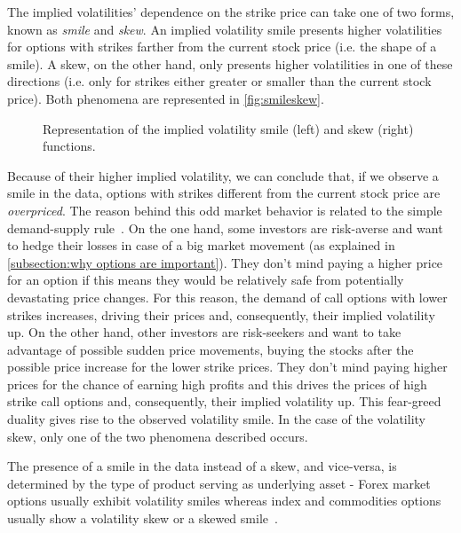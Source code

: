 The implied volatilities' dependence on the strike price can take one of two forms, known as \emph{smile} and \emph{skew}.
An implied volatility smile presents higher volatilities for options with strikes farther from the current stock price (i.e. the shape of a smile). A skew, on the other hand, only presents higher volatilities in one of these directions (i.e. only for strikes either greater or smaller than the current stock price). Both phenomena are represented in \autoref{fig:smileskew}.
\begin{figure}[!htb]
  \begin{subfigmatrix}{2}
  \end{subfigmatrix}
  \caption[Representation of the implied volatility smile and skew functions.]{Representation of the implied volatility smile (left) and skew (right) functions.}
  \label{fig:smileskew}
\end{figure}


Because of their higher implied volatility, we can conclude that, if we observe a smile in the data, options with strikes different from the current stock price are \emph{overpriced}.
The reason behind this odd market behavior is related to the simple demand-supply rule~\citep{Wilmott3}. On the one hand, some investors are risk-averse and want to hedge their losses in case of a big market movement (as explained in \autoref{subsection:why options are important}). They don't mind paying a higher price for an option if this means they would be relatively safe from potentially devastating price changes. For this reason, the demand of call options with lower strikes increases, driving their prices and, consequently, their implied volatility up. On the other hand, other investors are risk-seekers and want to take advantage of possible sudden price movements, buying the stocks after the possible price increase for the lower strike prices. They don't mind paying higher prices for the chance of earning high profits and this drives the prices of high strike call options and, consequently, their implied volatility up. This fear-greed duality gives rise to the observed volatility smile. 
In the case of the volatility skew, only one of the two phenomena described occurs.


The presence of a smile in the data instead of a skew, and vice-versa, is determined by the type of product serving as underlying asset - Forex market options usually exhibit volatility smiles whereas index and commodities options usually show a volatility skew or a skewed smile~\citep{Wilmott3}.

